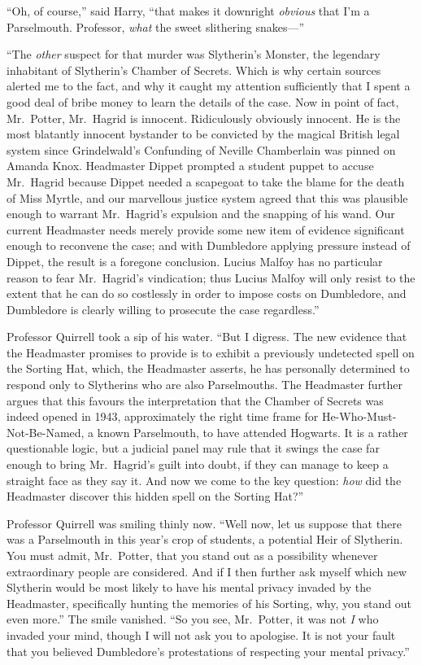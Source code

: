 ``Oh, of course,'' said Harry, ``that makes it downright \emph{obvious}
that I'm a Parselmouth. Professor, \emph{what} the sweet slithering
snakes---''

``The \emph{other} suspect for that murder was Slytherin's Monster, the
legendary inhabitant of Slytherin's Chamber of Secrets. Which is why
certain sources alerted me to the fact, and why it caught my attention
sufficiently that I spent a good deal of bribe money to learn the
details of the case. Now in point of fact, Mr.~Potter, Mr.~Hagrid is
innocent. Ridiculously obviously innocent. He is the most blatantly
innocent bystander to be convicted by the magical British legal system
since Grindelwald's Confunding of Neville Chamberlain was pinned on
Amanda Knox. Headmaster Dippet prompted a student puppet to accuse
Mr.~Hagrid because Dippet needed a scapegoat to take the blame for the
death of Miss Myrtle, and our marvellous justice system agreed that this
was plausible enough to warrant Mr.~Hagrid's expulsion and the snapping
of his wand. Our current Headmaster needs merely provide some new item
of evidence significant enough to reconvene the case; and with
Dumbledore applying pressure instead of Dippet, the result is a foregone
conclusion. Lucius Malfoy has no particular reason to fear Mr.~Hagrid's
vindication; thus Lucius Malfoy will only resist to the extent that he
can do so costlessly in order to impose costs on Dumbledore, and
Dumbledore is clearly willing to prosecute the case regardless.''

Professor Quirrell took a sip of his water. ``But I digress. The new
evidence that the Headmaster promises to provide is to exhibit a
previously undetected spell on the Sorting Hat, which, the Headmaster
asserts, he has personally determined to respond only to Slytherins who
are also Parselmouths. The Headmaster further argues that this favours
the interpretation that the Chamber of Secrets was indeed opened in
1943, approximately the right time frame for He-Who-Must-Not-Be-Named, a
known Parselmouth, to have attended Hogwarts. It is a rather
questionable logic, but a judicial panel may rule that it swings the
case far enough to bring Mr.~Hagrid's guilt into doubt, if they can
manage to keep a straight face as they say it. And now we come to the
key question: \emph{how} did the Headmaster discover this hidden spell
on the Sorting Hat?''

Professor Quirrell was smiling thinly now. ``Well now, let us suppose
that there was a Parselmouth in this year's crop of students, a
potential Heir of Slytherin. You must admit, Mr.~Potter, that you stand
out as a possibility whenever extraordinary people are considered. And
if I then further ask myself which new Slytherin would be most likely to
have his mental privacy invaded by the Headmaster, specifically hunting
the memories of his Sorting, why, you stand out even more.'' The smile
vanished. ``So you see, Mr.~Potter, it was not \emph{I} who invaded your
mind, though I will not ask you to apologise. It is not your fault that
you believed Dumbledore's protestations of respecting your mental
privacy.''


